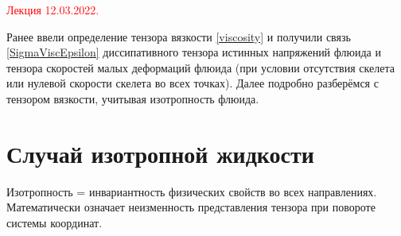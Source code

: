 \documentclass[main.tex]{subfiles}
\begin{document}
\textcolor{red}{Лекция 12.03.2022.}

Ранее ввели определение тензора вязкости \eqref{viscosity} и получили связь \eqref{SigmaViscEpsilon} диссипативного тензора истинных напряжений флюида и тензора скоростей малых деформаций флюида (при условии отсутствия скелета или нулевой скорости скелета во всех точках). Далее подробно разберёмся с тензором вязкости, учитывая изотропность флюида.

\section{Случай изотропной жидкости}

Изотропность = инвариантность физических свойств во всех направлениях. Математически означает неизменность представления тензора при повороте системы координат.
\end{document}
